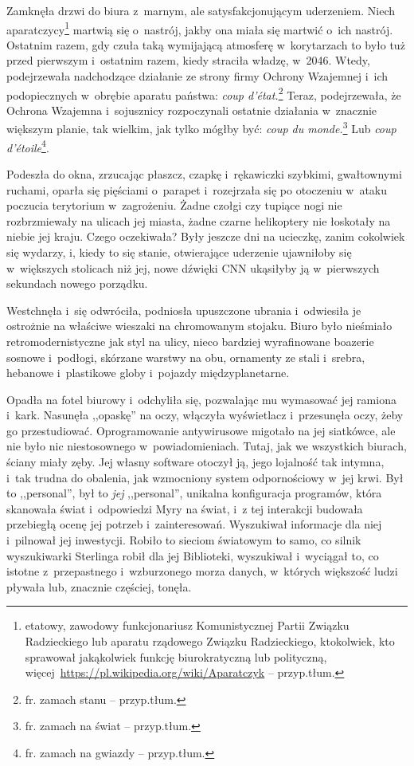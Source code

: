 \documentclass[oneside,polish,11pt,sfheadings]{mwbk}
\begin{document}
Zamknęła drzwi do biura z~marnym, ale satysfakcjonującym uderzeniem.
Niech aparatczycy\footnote{ etatowy, zawodowy funkcjonariusz Komunistycznej
Partii Związku Radzieckiego lub aparatu rządowego Związku Radzieckiego, ktokolwiek, kto sprawował jakąkolwiek funkcję
biurokratyczną lub polityczną,
więcej~\url{https://pl.wikipedia.org/wiki/Aparatczyk} -- przyp.tłum.} martwią się o~nastrój, jakby ona miała się martwić o~ich
nastrój. Ostatnim razem, gdy czuła taką wymijającą atmosferę w~korytarzach to było tuż przed pierwszym i~ostatnim razem, kiedy straciła
władzę, w~2046. Wtedy, podejrzewała nadchodzące działanie ze strony
firmy Ochrony Wzajemnej i~ich podopiecznych w~obrębie aparatu państwa:
\textit{coup d'état.}\footnote{ fr. zamach stanu -- przyp.tłum.} Teraz,
podejrzewała, że Ochrona Wzajemna i~sojusznicy rozpoczynali ostatnie
działania w~znacznie większym planie, tak wielkim, jak tylko mógłby być:
\textit{coup du monde.}\footnote{ fr. zamach na świat -- przyp.tłum.} Lub
\textit{coup d'étoile}\footnote{ fr. zamach na gwiazdy -- przyp.tłum.}.

Podeszła do okna, zrzucając płaszcz, czapkę i~rękawiczki szybkimi,
gwałtownymi ruchami, oparła się pięściami o~parapet i~rozejrzała się po
otoczeniu w~ataku poczucia terytorium w~zagrożeniu. Żadne czołgi czy tupiące
nogi nie rozbrzmiewały na ulicach jej miasta, żadne czarne helikoptery
nie łoskotały na niebie jej kraju. Czego oczekiwała? Były jeszcze dni na
ucieczkę, zanim cokolwiek się wydarzy, i, kiedy to się stanie,
otwierające uderzenie ujawniłoby się w~większych stolicach niż jej, nowe
dźwięki CNN ukąsiłyby ją w~pierwszych sekundach nowego porządku.

Westchnęła i~się odwróciła, podniosła upuszczone ubrania i~odwiesiła je
ostrożnie na właściwe wieszaki na chromowanym stojaku. Biuro było
nieśmiało retromodernistyczne jak styl na ulicy, nieco bardziej
wyrafinowane boazerie sosnowe i~podłogi, skórzane warstwy na obu,
ornamenty ze stali i~srebra, hebanowe i~plastikowe globy i~pojazdy
międzyplanetarne.

Opadła na fotel biurowy i~odchyliła się, pozwalając mu wymasować jej
ramiona i~kark. Nasunęła ,,opaskę'' na oczy, włączyła wyświetlacz i~przesunęła oczy, żeby go przestudiować. Oprogramowanie antywirusowe
migotało na jej siatkówce, ale nie było nic niestosownego w~powiadomieniach. Tutaj, jak we wszystkich biurach, ściany miały zęby.
Jej własny software otoczył ją, jego lojalność tak intymna, i~tak trudna
do obalenia, jak wzmocniony system odpornościowy w~jej krwi. Był to
,,personal'', był to \textit{jej },,personal'', unikalna konfiguracja
programów, która skanowała świat i~odpowiedzi Myry na świat, i~z tej
interakcji budowała przebiegłą ocenę jej potrzeb i~zainteresowań. Wyszukiwał informacje dla niej i~pilnował jej inwestycji. Robiło to
sieciom światowym to samo, co silnik wyszukiwarki Sterlinga robił dla
jej Biblioteki, wyszukiwał i~wyciągał to, co istotne z~przepastnego i~wzburzonego morza danych, w~których większość ludzi pływała lub,
znacznie częściej, tonęła.
\end{document}
